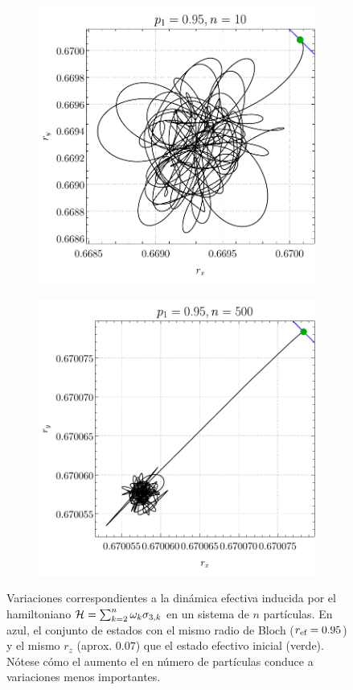 \begin{figure}[ht!]
    \centering
    \begin{subfigure}{0.5\textwidth}
      \centering
      \includegraphics[width=0.9\linewidth]{chapter4/figures_separable/local_prefinv_ran_n=10_p=0.95_r=0.95_a=-3_b=3.pdf}
    \end{subfigure}%
    \begin{subfigure}{0.5\textwidth}
      \centering
      \includegraphics[width=0.9\linewidth]{chapter4/figures_separable/local_prefinv_ran_n=500_p=0.95_r=0.95_a=-3_b=3.pdf}
    \end{subfigure}
    \caption{Variaciones correspondientes a la dinámica efectiva inducida por el hamiltoniano $\mathcal{H}=\sum_{k=2}^{n}\omega_{k}\sigma_{3,k}$ en un sistema de $n$ partículas. En azul, el conjunto de estados con el mismo radio de Bloch ($r_{\text{ef}}=0.95$) y el mismo $r_{z}$ (aprox. $0.07$) que el estado efectivo inicial (verde). Nótese cómo el aumento el en número de partículas conduce a variaciones menos importantes. \label{fig:PrefInv1}}
\end{figure}

